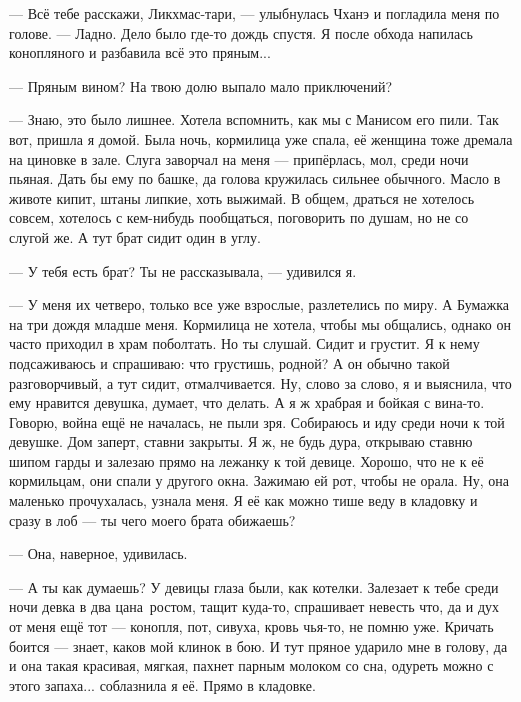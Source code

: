 --- Всё тебе расскажи, Ликхмас-тари, --- улыбнулась Чханэ и погладила меня по голове.
--- Ладно.
Дело было где-то дождь спустя.
Я после обхода напилась конопляного и разбавила всё это пряным...

--- Пряным вином\FM?
На твою долю выпало мало приключений?

--- Знаю, это было лишнее.
Хотела вспомнить, как мы с Манисом его пили.
Так вот, пришла я домой.
Была ночь, кормилица уже спала, её женщина тоже дремала на циновке в зале.
Слуга заворчал на меня --- припёрлась, мол, среди ночи пьяная.
Дать бы ему по башке, да голова кружилась сильнее обычного.
Масло в животе кипит, штаны липкие, хоть выжимай.
В общем, драться не хотелось совсем, хотелось с кем-нибудь пообщаться, поговорить по душам, но не со слугой же.
А тут брат сидит один в углу.

--- У тебя есть брат?
Ты не рассказывала, --- удивился я.

--- У меня их четверо, только все уже взрослые, разлетелись по миру.
А Бумажка на три дождя младше меня.
Кормилица не хотела, чтобы мы общались, однако он часто приходил в храм поболтать.
Но ты слушай.
Сидит и грустит.
Я к нему подсаживаюсь и спрашиваю: что грустишь, родной?
А он обычно такой разговорчивый, а тут сидит, отмалчивается.
Ну, слово за слово, я и выяснила, что ему нравится девушка, думает, что делать.
А я ж храбрая и бойкая с вина-то.
Говорю, война ещё не началась, не пыли зря.
Собираюсь и иду среди ночи к той девушке.
Дом заперт, ставни закрыты.
Я ж, не будь дура, открываю ставню шипом гарды и залезаю прямо на лежанку к той девице.
Хорошо, что не к её кормильцам, они спали у другого окна.
Зажимаю ей рот, чтобы не орала.
Ну, она маленько прочухалась, узнала меня.
Я её как можно тише веду в кладовку и сразу в лоб --- ты чего моего брата обижаешь?

--- Она, наверное, удивилась.

--- А ты как думаешь?
У девицы глаза были, как котелки.
Залезает к тебе среди ночи девка в два цана\FM\ ростом, тащит куда-то, спрашивает невесть что, да и дух от меня ещё тот --- конопля, пот, сивуха, кровь чья-то, не помню уже.
Кричать боится --- знает, каков мой клинок в бою.
И тут пряное ударило мне в голову, да и она такая красивая, мягкая, пахнет парным молоком со сна, одуреть можно с этого запаха... соблазнила я её.
Прямо в кладовке.

